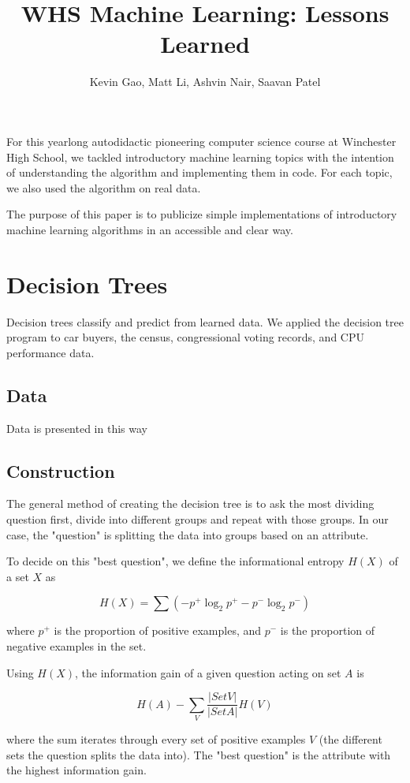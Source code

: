 \documentclass[12pt,a4paper]{article}
\author{Kevin Gao, Matt Li, Ashvin Nair, Saavan Patel}
\title{WHS Machine Learning: Lessons Learned}
\begin{document}
\maketitle

For this yearlong autodidactic pioneering computer science course at Winchester High School, we tackled introductory machine learning topics with the intention of understanding the algorithm and implementing them in code. For each topic, we also used the algorithm on real data.

The purpose of this paper is to publicize simple implementations of introductory machine learning algorithms in an accessible and clear way.

\section{Decision Trees}

Decision trees classify and predict from learned data. We applied the decision tree program to car buyers, the census, congressional voting records, and CPU performance data.

\subsection{Data}
Data is presented in this way

\subsection{Construction}
The general method of creating the decision tree is to ask the most dividing question first, divide into different groups and repeat with those groups. In our case, the "question" is splitting the data into groups based on an attribute.

To decide on this "best question", we define the informational entropy $H(X)$ of a set $X$ as 

\[
H(X) = \sum{(-p^+ \log_2{p^+} - p^- \log_2{p^-})}
\]

where $p^+$ is the proportion of positive examples, and $p^-$ is the proportion of negative examples in the set.

Using $H(X)$, the information gain of a given question acting on set $A$ is

\[
H(A) - \sum_V{\frac{|Set V|}{|Set A|}H(V)}
\]

where the sum iterates through every set of positive examples $V$ (the different sets the question splits the data into). The "best question" is the attribute with the highest information gain.
\end{document}
